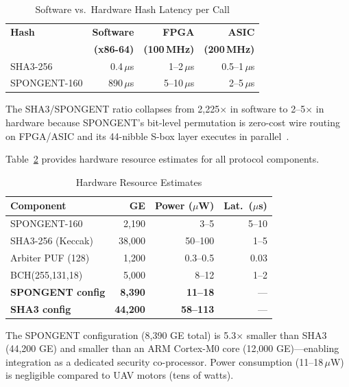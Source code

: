 \documentclass[conference]{IEEEtran}
\begin{document}
\begin{table}[H]
\centering
\caption{Software vs.\ Hardware Hash Latency per Call}
\label{tab:hw}
\footnotesize
\begin{tabular}{@{}lrrr@{}}
\toprule
\textbf{Hash} & \textbf{Software} & \textbf{FPGA} & \textbf{ASIC} \\
& \textbf{(x86-64)} & \textbf{(100\,MHz)} & \textbf{(200\,MHz)} \\
\midrule
SHA3-256 & 0.4\,$\mu$s & 1--2\,$\mu$s & 0.5--1\,$\mu$s \\
SPONGENT-160 & 890\,$\mu$s & 5--10\,$\mu$s & 2--5\,$\mu$s \\
\bottomrule
\end{tabular}
\end{table}

The SHA3/SPONGENT ratio collapses from 2,225$\times$ in software to 2--5$\times$ in hardware because SPONGENT's bit-level permutation is zero-cost wire routing on FPGA/ASIC and its 44-nibble S-box layer executes in parallel~\cite{spongent_original}.

Table~\ref{tab:hw_area} provides hardware resource estimates for all protocol components.

\begin{table}[H]
\centering
\caption{Hardware Resource Estimates}
\label{tab:hw_area}
\footnotesize
\begin{tabular}{@{}lrrr@{}}
\toprule
\textbf{Component} & \textbf{GE} & \textbf{Power ($\mu$W)} & \textbf{Lat.\ ($\mu$s)} \\
\midrule
SPONGENT-160 & 2,190 & 3--5 & 5--10 \\
SHA3-256 (Keccak) & 38,000 & 50--100 & 1--5 \\
Arbiter PUF (128) & 1,200 & 0.3--0.5 & 0.03 \\
BCH(255,131,18) & 5,000 & 8--12 & 1--2 \\
\midrule
\textbf{SPONGENT config} & \textbf{8,390} & \textbf{11--18} & --- \\
\textbf{SHA3 config} & \textbf{44,200} & \textbf{58--113} & --- \\
\bottomrule
\end{tabular}
\end{table}

The SPONGENT configuration (8,390 GE total) is 5.3$\times$ smaller than SHA3 (44,200 GE) and smaller than an ARM Cortex-M0 core (12,000 GE)---enabling integration as a dedicated security co-processor. Power consumption (11--18\,$\mu$W) is negligible compared to UAV motors (tens of watts).
\end{document}
